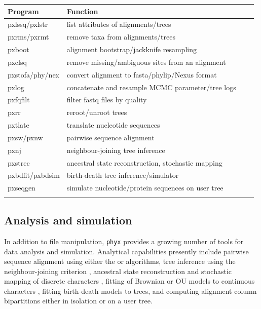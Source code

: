 \documentclass{bioinfo}
\begin{document}
\begin{methods}
\begin{table}[!t]
 {\begin{tabular}{@{}llll@{}}\toprule Program &
Function\\\midrule
pxlssq/pxlstr & list attributes of alignments/trees\\
pxrms/pxrmt & remove taxa from alignments/trees\\
pxboot & alignment bootstrap/jackknife resampling\\
pxclsq & remove missing/ambiguous sites from an alignment\\
pxstofa/phy/nex & convert alignment to fasta/phylip/Nexus format\\
pxlog & concatenate and resample MCMC parameter/tree logs\\
pxfqfilt & filter fastq files by quality\\
pxrr & reroot/unroot trees\\
pxtlate &  translate nucleotide sequences\\
pxsw/pxnw & pairwise sequence alignment\\
pxnj & neighbour-joining tree inference\\
pxstrec & ancestral state reconstruction, stochastic mapping\\
pxbdfit/pxbdsim & birth-death tree inference/simulator\\
pxseqgen & simulate nucleotide/protein sequences on user tree\\\botrule
\end{tabular}}{}
\end{table}

\subsection{Analysis and simulation}

In addition to file manipulation, \texttt{phyx} provides a growing
number of tools for data analysis and simulation. Analytical capabilities
presently include pairwise sequence alignment using either the
\citet{NeedlemanWunsch1970} or \citet{SmithWaterman1981} algorithms,
tree inference using the neighbour-joining criterion \citep{SaitouNei1987},
ancestral state reconstruction and stochastic mapping of discrete characters
\citep{Nielsen2002}, fitting of Brownian or OU models to continuous
characters \citep{ButlerKing2004}, fitting birth-death models to trees, and
computing alignment column bipartitions either in isolation or on a user
tree.


\end{methods}
\end{document}
